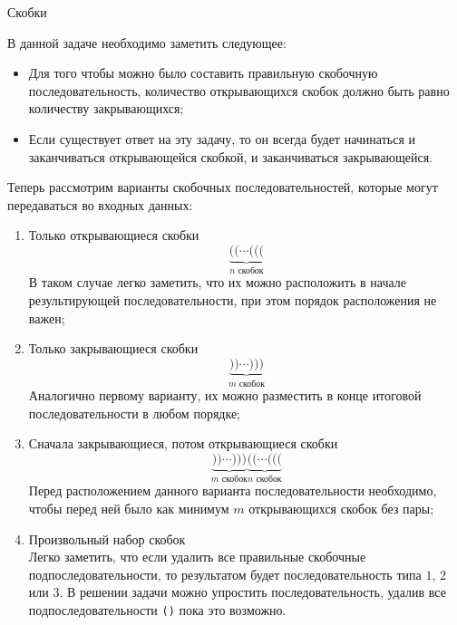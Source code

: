 \begin{tutorial}{Скобки}

В данной задаче необходимо заметить следующее:
\begin{itemize}
  \item Для того чтобы можно было составить правильную скобочную последовательность, количество открывающихся скобок должно быть равно количеству закрывающихся;
  \item Если существует ответ на эту задачу, то он всегда будет начинаться и заканчиваться открывающейся скобкой, и заканчиваться закрывающейся.
\end{itemize}

Теперь рассмотрим варианты скобочных последовательностей, которые могут передаваться во входных данных:
\begin{enumerate}
  \item Только открывающиеся скобки \[
      \underbrace{\texttt{((}\cdots\texttt{(((}}_{n \text{ скобок}}
    \]
    В таком случае легко заметить, что их можно расположить в начале результирующей последовательности, при этом порядок расположения не важен;
  \item Только закрывающиеся скобки  \[
      \underbrace{\texttt{))}\cdots\texttt{)))}}_{m \text{ скобок}}
    \]
    Аналогично первому варианту, их можно разместить в конце итоговой последовательности в любом порядке;
  \item Сначала закрывающиеся, потом открывающиеся скобки \[
      \underbrace{\texttt{))}\cdots\texttt{)))}}_{m \text{ скобок}}\underbrace{\texttt{((}\cdots\texttt{(((}}_{n \text{ скобок}}
    \]
    Перед расположением данного варианта последовательности необходимо, чтобы перед ней было как минимум $m$ открывающихся скобок без пары;
  \item Произвольный набор скобок \\
    Легко заметить, что если удалить все правильные скобочные подпоследовательности, то результатом будет последовательность типа $1$, $2$ или $3$. В решении задачи можно упростить последовательность, удалив все подпоследовательности \texttt{()} пока это возможно.
\end{enumerate}


\end{tutorial}

